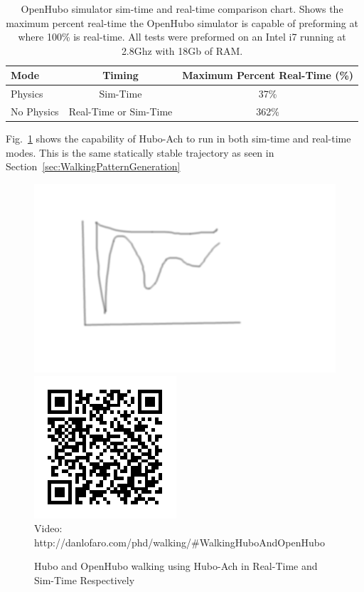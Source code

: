 \begin{table}
\centering
\caption{OpenHubo simulator sim-time and real-time comparison chart.  Shows the maximum percent real-time the OpenHubo simulator is capable of preforming at where 100\% is real-time.  All tests were preformed on an Intel i7 running at 2.8Ghz with 18Gb of RAM.}
\begin{tabular}{| l || c | c |}
\hline
Mode               & Timing                & Maximum Percent Real-Time (\%) \\
\hline
\hline
Physics            & Sim-Time              & 37\%   \\
\hline
No Physics         & Real-Time or Sim-Time & 362\%  \\
\hline
\end{tabular}\label{table:simtime}
\end{table}


Fig.~\ref{fig:huboOpenHuboWalking} shows the capability of Hubo-Ach to run in both sim-time and real-time modes.  
This is the same statically stable trajectory as seen in Section~\ref{sec:WalkingPatternGeneration}


\begin{figure}[thpb]
  \centering
      \includegraphics[width=0.69\columnwidth]{./pix/tmp.png}
      \includegraphics[width=0.3\columnwidth]{./qrcode/qrcode-hubo-openhubo-walking.png}\\
      Video: http://danlofaro.com/phd/walking/\#WalkingHuboAndOpenHubo
\caption{Hubo and OpenHubo walking using Hubo-Ach in Real-Time and Sim-Time Respectively}
\label{fig:huboOpenHuboWalking}
\end{figure}

